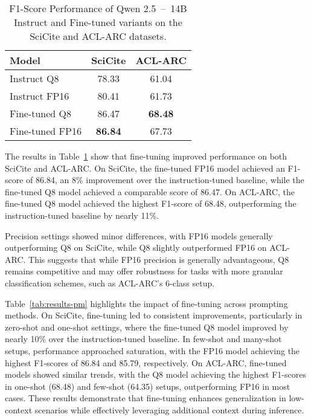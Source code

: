 \begin{table}[t]
    \centering
    \scriptsize
    \begin{tabular}{lcc}
        \toprule
        \textbf{Model}      & \textbf{SciCite}  & \textbf{ACL-ARC}  \\
        \midrule
        Instruct Q8         & 78.33             & 61.04             \\
        Instruct FP16       & 80.41             & 61.73             \\
        Fine-tuned Q8        & 86.47             & \textbf{68.48}    \\
        Fine-tuned FP16      & \textbf{86.84}    & 67.73             \\
        \bottomrule
        \end{tabular}
        \caption{F1-Score Performance of Qwen 2.5~--~14B Instruct and Fine-tuned variants on the SciCite and ACL-ARC datasets.}\label{tab:results-simple}
\end{table}

The results in Table~\ref{tab:results-simple} show that fine-tuning improved performance on both SciCite and ACL-ARC. On SciCite, the fine-tuned FP16 model achieved an F1-score of 86.84, an 8\% improvement over the instruction-tuned baseline, while the fine-tuned Q8 model achieved a comparable score of 86.47. On ACL-ARC, the fine-tuned Q8 model achieved the highest F1-score of 68.48, outperforming the instruction-tuned baseline by nearly 11\%.

Precision settings showed minor differences, with FP16 models generally outperforming Q8 on SciCite, while Q8 slightly outperformed FP16 on ACL-ARC. This suggests that while FP16 precision is generally advantageous, Q8 remains competitive and may offer robustness for tasks with more granular classification schemes, such as ACL-ARC's 6-class setup.

Table~\ref{tab:results-pm} highlights the impact of fine-tuning across prompting methods. On SciCite, fine-tuning led to consistent improvements, particularly in zero-shot and one-shot settings, where the fine-tuned Q8 model improved by nearly 10\% over the instruction-tuned baseline. In few-shot and many-shot setups, performance approached saturation, with the FP16 model achieving the highest F1-scores of 86.84 and 85.79, respectively. On ACL-ARC, fine-tuned models showed similar trends, with the Q8 model achieving the highest F1-scores in one-shot (68.48) and few-shot (64.35) setups, outperforming FP16 in most cases.
These results demonstrate that fine-tuning enhances generalization in low-context scenarios while effectively leveraging additional context during inference.

